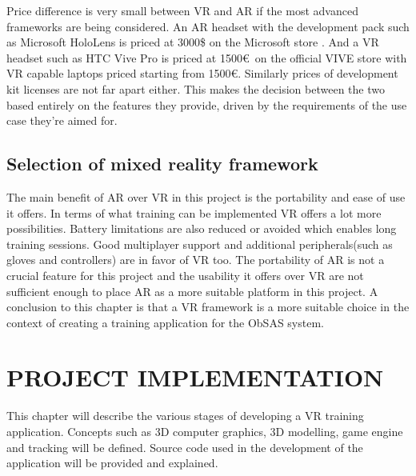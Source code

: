 \documentclass[12pt, a4paper,oneside, nocenter]{thesis}
\begin{document}
\par
Price difference is very small between VR and AR if the most advanced frameworks are being considered. An AR headset with the development pack such as Microsoft HoloLens is priced at 3000\$ on the Microsoft store \citeyearpar{hololens-price}. And a VR headset such as HTC Vive Pro is priced at 1500\euro\ on the official VIVE store \citeyearpar{htc-vive-pro} with VR capable laptops priced starting from 1500\euro. Similarly prices of development kit licenses are not far apart either. This makes the decision between the two based entirely on the features they provide, driven by the requirements of the use case they're aimed for.
\par
\section{Selection of mixed reality framework}
The main benefit of AR over VR in this project is the portability and ease of use it offers. In terms of what training can be implemented VR offers a lot more possibilities. Battery limitations are also reduced or avoided which enables long training sessions. Good multiplayer support and additional peripherals(such as gloves and controllers) are in favor of VR too. The portability of AR is not a crucial feature for this project and the usability it offers over VR are not sufficient enough to place AR as a more suitable platform in this project. A conclusion to this chapter is that a VR framework is a more suitable choice in the context of creating a training application for the ObSAS system.
\par
\chapter{\MakeUppercase{Project implementation}}
This chapter will describe the various stages of developing a VR training application. Concepts such as 3D computer graphics, 3D modelling, game engine and tracking will be defined. Source code used in the development of the application will be provided and explained.
\par
\end{document}
